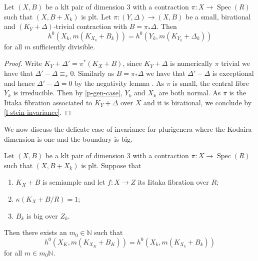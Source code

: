 \documentclass[a4paper,12pt]{book}
\DeclareMathOperator{\Spec}{Spec}
\newcommand{\bN}{\mathbb{N}}
\begin{document}
	\begin{lemma}\label{l-reduce-Q-fac}
		Let $(X,B)$ be a klt pair of dimension $3$ with a contraction $\pi \colon X \to \Spec(R)$ such that $(X,B+X_{k})$ is plt.
		Let $\pi\colon (Y,\Delta) \to (X,B)$ be a small, birational and $(K_{Y}+\Delta)$-trivial contraction with $B=\pi_{*}\Delta$. 
		Then
		$$h^{0}(X_{k},m(K_{X_k}+B_{k}))= h^{0}(Y_{k},m(K_{Y_{k}}+\Delta_{k}))$$ 
		for all $m$ sufficiently divisible. 
	\end{lemma}

	\begin{proof}
		Write $K_Y+\Delta'=\pi^* (K_X+B)$, since $K_{Y}+\Delta$ is numerically $\pi$ trivial we have that $\Delta'-\Delta \equiv_{\pi} 0$. Similarly as $B=\pi_{*}\Delta$ we have that $\Delta'-\Delta$ is exceptional and hence $\Delta'-\Delta=0$ by the negativity lemma \cite[Lemma 2.14]{bhatt2020}. As $\pi$ is small, the central fibre $Y_k$ is irreducible. 
		Then by \autoref{p-gen-case}, $Y_k$ and $X_k$ are both normal.
		As $\pi$ is the Iitaka fibration associated to $K_Y+\Delta$ over $X$ and it is birational, we conclude by \autoref{l-stein-invariance}.
	\end{proof}
	
	We now discuss the delicate case of invariance for plurigenera where the Kodaira dimension is one and the boundary is big.
	
	
	\begin{proposition}\label{p-1-case}
		
		Let $(X,B)$ be a klt pair of dimension $3$ with a contraction $\pi \colon X \to \Spec(R)$ such that $(X,B+X_{k})$ is plt. Suppose that
		\begin{enumerate}
			\item $K_X+B$ is semiample and let $f\colon X \to Z$ its Iitaka fibration over $R$;
			\item $\kappa(K_X+B/R)=1$;
			\item $B_{k}$ is big over $Z_{k}$.
		\end{enumerate}
		Then there exists an $m_{0} \in \mathbb{N}$  such that 
		$$h^0(X_K,m(K_{X_K}+B_K))=h^0(X_k,m(K_{X_k}+B_k))$$
		for all $m\in m_0\bN$.	
	\end{proposition}
	
\end{document}

